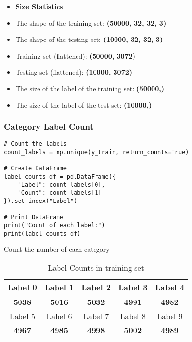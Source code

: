 \documentclass[a4paper,11pt]{article}
\begin{document}
\begin{itemize}
    \item \textbf{Size Statistics}
    \item The shape of the training set: \textbf{(50000, 32, 32, 3)}
    \item The shape of the testing set: \textbf{(10000, 32, 32, 3)}
    \item Training set (flattened): \textbf{(50000, 3072)}
    \item Testing set (flattened): \textbf{(10000, 3072)}
    \item The size of the label of the training set:  \textbf{(50000,)}
    \item The size of the label of the test set: \textbf{(10000,)}
\end{itemize}

\subsubsection{Category Label Count}

\begin{listing}[!ht]
\begin{verbatim}
# Count the labels
count_labels = np.unique(y_train, return_counts=True)

# Create DataFrame
label_counts_df = pd.DataFrame({
    "Label": count_labels[0],
    "Count": count_labels[1]
}).set_index("Label")

# Print DataFrame
print("Count of each label:")
print(label_counts_df)
\end{verbatim}
\caption{Count the number of each category}
\label{listing:python}
\end{listing}

\begin{table}[h]
    \centering
    \begin{tabular}{|c|c|c|c|c|}
        \hline
        Label 0 & Label 1 & Label 2 & Label 3 & Label 4 \\
        \hline
        \textbf{5038} & \textbf{5016} & \textbf{5032} & \textbf{4991} & \textbf{4982} \\
        \hline
        Label 5 & Label 6 & Label 7 & Label 8 & Label 9 \\
        \hline
        \textbf{4967} & \textbf{4985} & \textbf{4998} & \textbf{5002} & \textbf{4989} \\
        \hline
    \end{tabular}
    \caption{Label Counts in training set}
    \label{tab:example}
\end{table}
\end{document}
